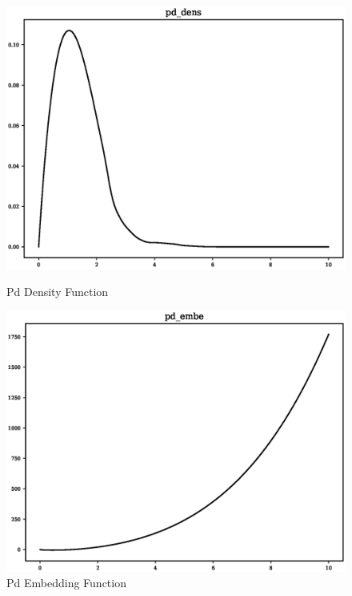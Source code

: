 \begin{figure}[ht]
\begin{minipage}[b]{0.4\linewidth}
    \includegraphics[width=.9\linewidth]{chapters/results_potential_fitting/pot_fepd_fcc_1/pd_dens.eps} 
    \caption{Pd Density Function} 
  \end{minipage}%
  \begin{minipage}[b]{0.4\linewidth}
    \centering
    \includegraphics[width=.9\linewidth]{chapters/results_potential_fitting/pot_fepd_fcc_1/pd_embe.eps} 
    \caption{Pd Embedding Function} 
  \end{minipage} 
  \label{fig:palladiumPotentialPlots} 
\end{figure}

